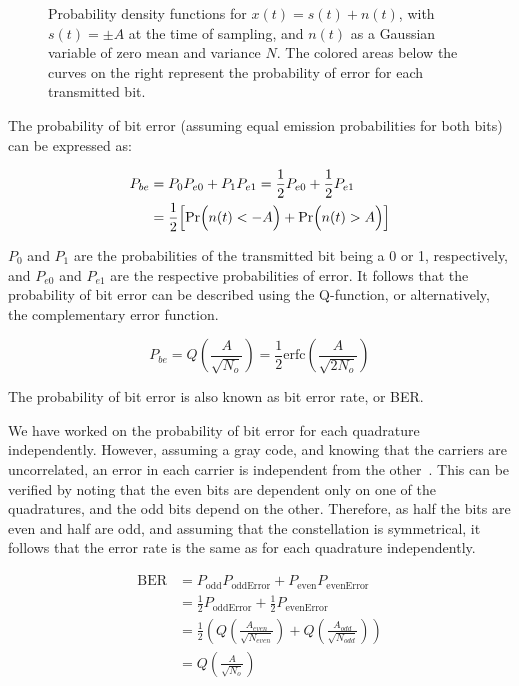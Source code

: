 \begin{figure}[]
\begin{minipage}{0.35\textwidth}
			\subcaption{}
		\end{minipage}
		\caption{Probability density functions for $x(t) = s(t) + n(t)$, with
		$s(t)=\pm A$ at the time of sampling, and $n(t)$ as a Gaussian variable of
	zero mean and variance $N$. The colored areas below the curves on the right
represent the probability of error for each transmitted bit.}
		\label{fig:gauss}
	\end{figure}

	The probability of bit error (assuming equal emission probabilities for both bits) can be expressed as:

	\begin{equation}
		\begin{split}
			P_{be} &= P_0 P_{e0} + P_1 P_{e1} = \frac{1}{2} P_{e0} +
			\frac{1}{2} P_{e1} \\
						 &= \frac{1}{2} \Bigl[\Pr\Bigl(n(t)<-A\Bigr) +
						 \Pr\Bigl(n(t)>A\Bigr)\Bigr]
		\end{split}
	\end{equation}

	$P_0$ and $P_1$ are the probabilities of the transmitted bit being a 0 or
	1, respectively, and $P_{e0}$ and  $P_{e1}$ are the respective probabilities of
	error. It follows that the probability of bit error can be described using the
	Q-function, or alternatively, the complementary error function.

	\begin{equation}\label{eq:berMQAM}
		P_{be} =  Q\left({\frac{A}{\sqrt{N_o}}}\right) = \frac{1}{2}
		\text{erfc}\left({\frac{A}{\sqrt{2 N_o}}}\right)
	\end{equation}

	The probability of bit error is also known as bit error rate, or BER.

	We have worked on the probability of bit error for each
	quadrature independently. However, assuming a gray code, and knowing that the
	carriers are uncorrelated, an error in each carrier is independent from the
	other~\cite{nguyen09}. This can be verified by noting that the even bits are
	dependent only on one of the quadratures, and the odd bits depend on the
	other. Therefore, as half the bits are even and half are odd, and assuming
	that the constellation is symmetrical, it follows that the error rate is the
	same as for each quadrature independently.

	\begin{equation}
		\begin{split}
			\text{BER} &= P_{\text{odd}} P_{\text{oddError}} +
								 P_{\text{even}}P_{\text{evenError}}\\
								 &= \frac{1}{2} P_{\text{oddError}} + \frac{1}{2}
								 P_{\text{evenError}}\\
								 &= \frac{1}{2} \left(Q\left({\frac{A_{even}}{\sqrt{N_{even}}}}\right)
								 +Q\left({\frac{A_{odd}}{\sqrt{N_{odd}}}}\right) \right)\\
								 &= Q\left({\frac{A}{\sqrt{N_o}}}\right)
		\end{split}
	\end{equation}


